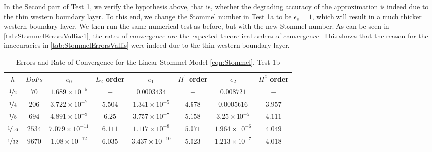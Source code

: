 In the Second part of Test 1, we verify the hypothesis above, that is, whether the degrading
accuracy of the approximation is indeed due to the thin western boundary layer. To this end, we
change the Stommel number in Test 1a to be $\epsilon_s=1$, which will result in a much thicker western boundary layer. We then run the same numerical test as before, but with the
new Stommel number. As can be seen in \autoref{tab:StommelErrorsVallise1}, the rates of convergence
are the expected theoretical orders of convergence. This shows that the reason for the inaccuracies
in \autoref{tab:StommelErrorsVallis} were indeed due to the thin western boundary layer.

\begin{table}[H]
\begin{center}
\begin{tabular}{|c|c|c|c|c|c|c|c|}%
  \hline
  $h$ & $DoFs$ & $e_0$ & $L_2$ order & $e_1$ & $H^1$ order & $e_2$ & $H^2$ order \\[0.2em] %
  \hline
  $\nicefrac{1}{2}$ & $70$ & $1.689\times 10^{-5}$ & $-$ & $0.0003434$ & $-$ & $0.008721$ & $-$ \\[0.2em] %
  $\nicefrac{1}{4}$ & $206$ & $3.722\times 10^{-7}$ & $5.504$ & $1.341\times 10^{-5}$ & $4.678$ & $0.0005616$ & $3.957$ \\[0.2em] %
  $\nicefrac{1}{8}$ & $694$ & $4.891\times 10^{-9}$ & $6.25$ & $3.757\times 10^{-7}$ & $5.158$ & $3.25\times 10^{-5}$ & $4.111$ \\[0.2em] %
  $\nicefrac{1}{16}$ & $2534$ & $7.079\times 10^{-11}$ & $6.111$ & $1.117\times 10^{-8}$ & $5.071$ & $1.964\times 10^{-6}$ & $4.049$ \\[0.2em] %
  $\nicefrac{1}{32}$ & $9670$ & $1.08\times 10^{-12}$ & $6.035$ & $3.437\times 10^{-10}$ & $5.023$ & $1.213\times 10^{-7}$ & $4.018$ \\[0.2em] %
  \hline
\end{tabular}
\end{center}
\caption{Errors and Rate of Convergence for the Linear Stommel Model \eqref{eqn:Stommel}, Test 1b \cite{Vallis06}} 
\label{tab:StommelErrorsVallise1}
\end{table}
 
